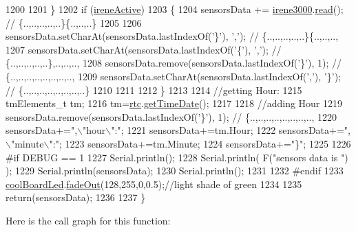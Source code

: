 \begin{DoxyCode}
1200 
1201     \}
1202     \textcolor{keywordflow}{if} (\hyperlink{class_cool_board_a9c3f7ac625481ee2ae802a25d97a4ae0}{ireneActive})
1203     \{
1204         sensorsData += \hyperlink{class_cool_board_ad103718ce316006c4695b8eb312eaf11}{irene3000}.\hyperlink{class_irene3000_a852a170feea994ea1df01c6b245b5d9a}{read}(); \textcolor{comment}{// \{..,..,..,..,..\}\{..,..,..\}}
1205 
1206         sensorsData.setCharAt(sensorsData.lastIndexOf(\textcolor{charliteral}{'\}'}), \textcolor{charliteral}{','}); \textcolor{comment}{// \{..,..,..,..,..\}\{..,..,..,}
1207         sensorsData.setCharAt(sensorsData.lastIndexOf(\textcolor{charliteral}{'\{'}), \textcolor{charliteral}{','}); \textcolor{comment}{// \{..,..,..,..,..\},..,..,..,}
1208         sensorsData.remove(sensorsData.lastIndexOf(\textcolor{charliteral}{'\}'}), 1); \textcolor{comment}{// \{..,..,..,..,..,..,..,..,}
1209         sensorsData.setCharAt(sensorsData.lastIndexOf(\textcolor{charliteral}{','}), \textcolor{charliteral}{'\}'}); \textcolor{comment}{// \{..,..,..,..,..,..,..,..\}      }
1210         
1211         
1212     \}
1213 
1214     \textcolor{comment}{//getting Hour:}
1215     tmElements\_t tm;
1216     tm=\hyperlink{class_cool_board_a50d2a6716879d64a85f3c6b44ad63275}{rtc}.\hyperlink{class_cool_time_a7a7501c5ca77dd1248bea704c44f986c}{getTimeDate}();
1217     
1218     \textcolor{comment}{//adding Hour}
1219     sensorsData.remove(sensorsData.lastIndexOf(\textcolor{charliteral}{'\}'}), 1); \textcolor{comment}{// \{..,..,..,..,..,..,..,..,   }
1220     sensorsData+=\textcolor{stringliteral}{",\(\backslash\)"hour\(\backslash\)":"};  
1221     sensorsData+=tm.Hour;
1222     sensorsData+=\textcolor{stringliteral}{",\(\backslash\)"minute\(\backslash\)":"};
1223     sensorsData+=tm.Minute;
1224     sensorsData+=\textcolor{stringliteral}{"\}"};
1225     
1226 \textcolor{preprocessor}{#if DEBUG == 1}
1227     Serial.println();
1228     Serial.println( F(\textcolor{stringliteral}{"sensors data is "}) );
1229     Serial.println(sensorsData);
1230     Serial.println();
1231 
1232 \textcolor{preprocessor}{#endif}
1233     \hyperlink{class_cool_board_a1b1d3c684a5baa56b08486e192fd8e97}{coolBoardLed}.\hyperlink{class_cool_board_led_a93d545679237e8cc858324367149775c}{fadeOut}(128,255,0,0.5);\textcolor{comment}{//light shade of green}
1234 
1235     \textcolor{keywordflow}{return}(sensorsData);
1236 
1237 \}
\end{DoxyCode}
Here is the call graph for this function\+:
\nopagebreak
